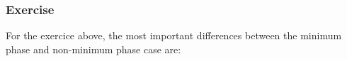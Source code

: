 \subsubsection{Exercise} 

For the exercice above, the most important differences between the minimum phase and non-minimum phase case are:
